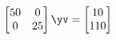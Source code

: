 \begin{activity}
{\(\begin{bmatrix} 50&0\\0&25 \end{bmatrix}\yv=\begin{bmatrix} 10\\110 \end{bmatrix}\)}
\end{activity}






